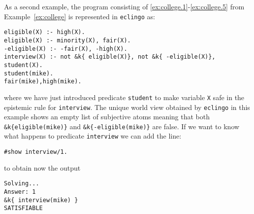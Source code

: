 \documentclass{new_tlp}
\def\eclingo{{\tt eclingo}}
\def\clingo{{\tt clingo}}
\begin{document}
As a second example, the program consisting of \eqref{ex:college.1}-\eqref{ex:college.5} from Example~\ref{ex:college} is represented in \eclingo{} as:
\begin{Verbatim}[frame=single]
eligible(X) :- high(X).
eligible(X) :- minority(X), fair(X).
-eligible(X) :- -fair(X), -high(X).
interview(X) :- not &k{ eligible(X)}, not &k{ -eligible(X)}, student(X).
student(mike).
fair(mike),high(mike).
\end{Verbatim}
where we have just introduced predicate {\tt student} to make variable {\tt X} safe in the epistemic rule for {\tt interview}.
%
The unique world view obtained by \eclingo{} in this example shows an empty list of subjective atoms meaning that both \mbox{\tt \&k\{eligible(mike)\}} and \mbox{\tt \&k\{-eligible(mike)\}} are false.
%
If we want to know what happens to predicate {\tt interview} we can add the line:
\begin{Verbatim}[frame=single]
#show interview/1.
\end{Verbatim}
to obtain now the output
\begin{Verbatim}[frame=single]
Solving...
Answer: 1
&k{ interview(mike) }
SATISFIABLE
\end{Verbatim}
\end{document}
